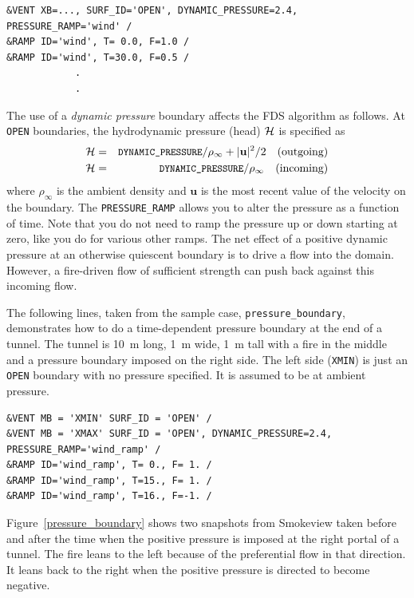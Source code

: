\documentclass[11pt]{book}
\newcommand{\ct}{\tt\small}
\begin{document}
\footnotesize
\begin{verbatim}
&VENT XB=..., SURF_ID='OPEN', DYNAMIC_PRESSURE=2.4, PRESSURE_RAMP='wind' /
&RAMP ID='wind', T= 0.0, F=1.0 /
&RAMP ID='wind', T=30.0, F=0.5 /
            .
            .
\end{verbatim}
\normalsize

\noindent
The use of a {\em dynamic pressure} boundary affects the FDS algorithm as follows.  At {\ct OPEN} boundaries, the hydrodynamic pressure (head) $\cal H$ is specified as
\begin{eqnarray}
{\cal H} &=& \mbox{\ct DYNAMIC\_PRESSURE}/\rho_\infty + {|\mathbf{u}|^2}/2 \quad  \mbox{(outgoing)}  \nonumber \\
{\cal H} &=& \mbox{\ct DYNAMIC\_PRESSURE}/\rho_\infty \quad                       \mbox{(incoming)}
\end{eqnarray}
where $\rho_\infty$ is the ambient density and $\mathbf{u}$ is the most recent value of the velocity on the boundary.
The {\ct PRESSURE\_RAMP} allows you to alter the pressure as a function of time. Note that you do not
need to ramp the pressure up or down starting at zero, like you do for various other ramps.
The net effect of a positive dynamic pressure at an otherwise quiescent boundary is to
drive a flow into the domain. However, a fire-driven flow of sufficient strength can push back against this incoming flow.

The following lines, taken from the sample case, {\ct pressure\_boundary}, demonstrates how to do
a time-dependent pressure boundary at the end of a tunnel. The tunnel is 10~m long, 1~m wide, 1~m tall
with a fire in the middle and a pressure boundary imposed on the right side. The left side ({\ct XMIN}) is
just an {\ct OPEN} boundary with no pressure specified. It is assumed to be at ambient pressure.

\footnotesize
\begin{verbatim}
&VENT MB = 'XMIN' SURF_ID = 'OPEN' /
&VENT MB = 'XMAX' SURF_ID = 'OPEN', DYNAMIC_PRESSURE=2.4, PRESSURE_RAMP='wind_ramp' /
&RAMP ID='wind_ramp', T= 0., F= 1. /
&RAMP ID='wind_ramp', T=15., F= 1. /
&RAMP ID='wind_ramp', T=16., F=-1. /
\end{verbatim}\normalsize

\noindent
Figure~\ref{pressure_boundary} shows two snapshots from Smokeview taken before and after the time when the positive pressure is
imposed at the right portal of a tunnel. The fire leans to the
left because of the preferential flow in that direction. It leans back to the right when the positive pressure
is directed to become negative.
\end{document}
